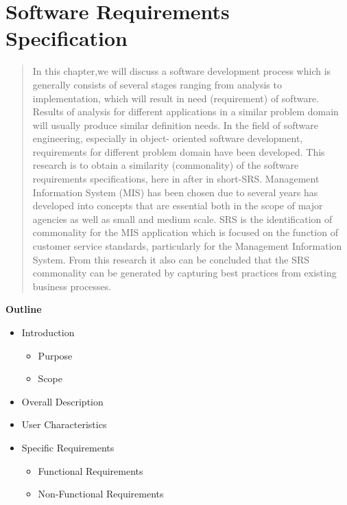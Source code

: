 
\section{Software Requirements Specification}

\vspace{20mm}



\begin{abstract}
	In this chapter,we will discuss a software development process which is generally consists of several stages ranging from analysis
    to implementation, which will result in need (requirement) of software. Results of analysis for different
    applications in a similar problem domain will usually produce similar definition needs. In the field of 
    software engineering, especially in object- oriented software development, requirements for different problem
    domain have been developed. This research is to obtain a similarity (commonality) of the software requirements
    specifications, here in after in short-SRS. Management Information System (MIS) has been chosen due to several
    years has developed into concepts that are essential both in the scope of major agencies as well as small and medium
    scale. SRS is the identification of commonality for the MIS application which is focused on the function of customer
    service standards, particularly for the Management Information System. From this research it also can be concluded
    that the SRS commonality can be generated by capturing best practices from existing business processes.
    
\end{abstract}

\vspace{20mm}

\large{\textbf{Outline}}

\begin{center}
    \begin{itemize}
        \item Introduction
              \begin{itemize}
                  \item Purpose
                  \item Scope
              \end{itemize}
        \item Overall Description
        \item User Characteristics
        \item Specific Requirements
              \begin{itemize}
                  \item Functional Requirements
                  \item Non-Functional Requirements
              \end{itemize}
    \end{itemize}
\end{center}
\pagebreak


